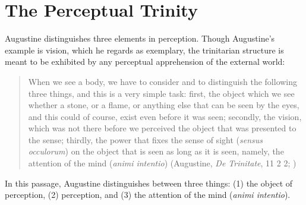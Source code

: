 \documentclass[12pt]{article}
\begin{document}

\section{The Perceptual Trinity} %
\label{sec:the_perceptual_trinity}

Augustine distinguishes three elements in perception. Though Augustine's example is vision, which he regards as exemplary, the trinitarian structure is meant to be exhibited by any perceptual apprehension of the external world:
\begin{quote}
	When we see a body, we have to consider and to distinguish the following three things, and this is a very simple task: first, the object which we see whether a stone, or a flame, or anything else that can be seen by the eyes, and this could of course, exist even before it was seen; secondly, the vision, which was not there before we perceived the object that was presented to the sense; thirdly, the power that fixes the sense of sight (\emph{sensus occulorum}) on the object that is seen as long as it is seen, namely, the attention of the mind (\emph{animi intentio}) (Augustine, \emph{De Trinitate}, 11 2 2; \citealt[61--62]{Matthews:2002ly})
\end{quote}
In this passage, Augustine distinguishes between three things: (1) the object of perception, (2) perception, and (3) the attention of the mind (\emph{animi intentio}).
\end{document}
